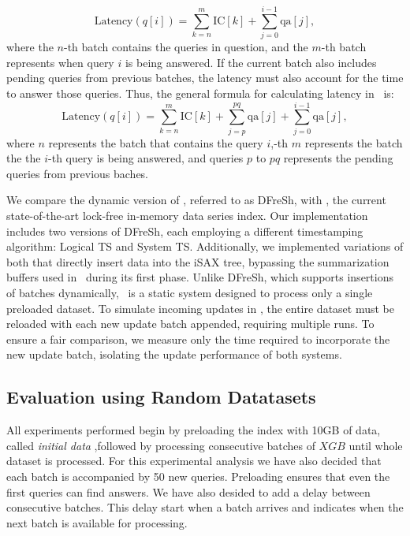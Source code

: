 \begin{equation}
\text{Latency}(q[i]) = \sum_{k=n}^{m} \text{IC}[k] + \sum_{j=0}^{i-1} \text{qa}[j],
\end{equation}
% 
where the $n$-th batch contains the queries in question, and the $m$-th batch represents 
when query $i$ is being answered. If the current batch also includes pending queries from 
previous batches, the latency must also account for the time to answer those queries. 
Thus, the general formula for calculating latency in \Fresh\ is:
% 
\begin{equation}
\text{Latency}(q[i]) = \sum_{k=n}^{m} \text{IC}[k] + \sum_{j=p}^{pq} \text{qa}[j] + \sum_{j=0}^{i-1} \text{qa}[j],
\end{equation}
% 
where $n$ represents the batch that contains the query $i$,-th 
$m$ represents the batch the the $i$-th query is being answered, 
and queries $p$ to $pq$ represents the pending queries from previous baches.


We compare the dynamic version of \Fresh, referred to as DFreSh, with \Fresh, 
the current state-of-the-art lock-free in-memory data series index. Our implementation 
includes two versions of DFreSh, each employing a different timestamping algorithm: 
Logical TS and System TS. Additionally, we implemented variations of both that directly 
insert data into the iSAX tree, bypassing the summarization buffers used in 
\Fresh\ during its first phase.
Unlike DFreSh, which supports insertions of batches dynamically, \Fresh\ is a static
system designed to process only a single preloaded dataset. To simulate incoming updates
in \Fresh, the entire dataset must be reloaded with each new update batch appended, requiring 
multiple runs. To ensure a fair comparison, we measure only the time required to 
incorporate the new update batch, isolating the update performance of both systems.

\subsection{Evaluation using Random Datatasets}
All experiments performed begin by preloading the index with 10GB of data, called
\textit{initial data} ,followed by processing consecutive batches of $XGB$ until 
whole dataset is processed. For this experimental analysis we have also decided
that each batch is accompanied by 50 new queries. Preloading ensures that even the first 
queries can find answers. We have also desided to add a delay between consecutive batches.
This delay start when a batch arrives and indicates when the next batch is available for
processing.

